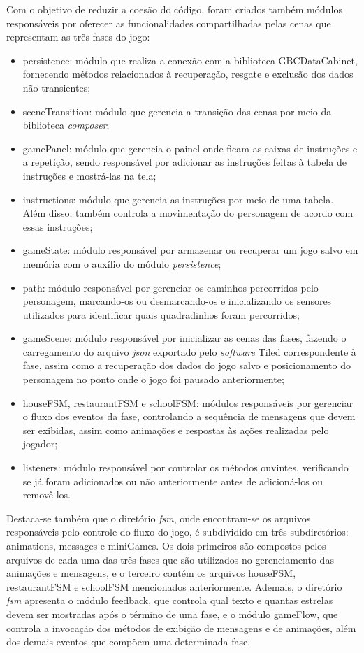 Com o objetivo de reduzir a coesão do código, foram criados também módulos responsáveis por oferecer as funcionalidades compartilhadas pelas cenas que representam as três fases do jogo:
\begin{itemize}
\item persistence: módulo que realiza a conexão com a biblioteca GBCDataCabinet, fornecendo métodos relacionados à recuperação, resgate e exclusão dos dados não-transientes;
\item sceneTransition: módulo que gerencia a transição das cenas por meio da biblioteca \textit{composer};
\item gamePanel: módulo que gerencia o painel onde ficam as caixas de instruções e a repetição, sendo responsável por adicionar as instruções feitas à tabela de instruções e mostrá-las na tela; 
\item instructions: módulo que gerencia as instruções por meio de uma tabela. Além disso, também controla a movimentação do personagem de acordo com essas instruções; 
\item gameState: módulo responsável por armazenar ou recuperar um jogo salvo em memória com o auxílio do módulo \textit{persistence};
\item path: módulo responsável por gerenciar os caminhos percorridos pelo personagem, marcando-os ou desmarcando-os e inicializando os sensores utilizados para identificar quais quadradinhos foram percorridos;
\item gameScene: módulo responsável por inicializar as cenas das fases, fazendo o carregamento do arquivo \textit{json} exportado pelo \textit{software} Tiled correspondente à fase, assim como a recuperação dos dados do jogo salvo e posicionamento do personagem no ponto onde o jogo foi pausado anteriormente;
\item houseFSM, restaurantFSM e schoolFSM: módulos responsáveis por gerenciar o fluxo dos eventos da fase, controlando a sequência de mensagens que devem ser exibidas, assim como animações e respostas às ações realizadas pelo jogador; 
\item listeners: módulo responsável por controlar os métodos ouvintes, verificando se já foram adicionados ou não anteriormente antes de adicioná-los ou removê-los. 
\end{itemize}

Destaca-se também que o diretório \textit{fsm}, onde encontram-se os arquivos responsáveis pelo controle do fluxo do jogo, é subdividido em três subdiretórios: animations, messages e miniGames. Os dois primeiros são compostos pelos arquivos de cada uma das três fases que são utilizados no gerenciamento das animações e mensagens, e o terceiro contém os arquivos houseFSM, restaurantFSM e schoolFSM mencionados anteriormente. Ademais, o diretório \textit{fsm} apresenta o módulo feedback, que controla qual texto e quantas estrelas devem ser mostradas após o término de uma fase, e o módulo gameFlow, que controla a invocação dos métodos de exibição de mensagens e de animações, além dos  demais eventos que compõem uma determinada fase. 
